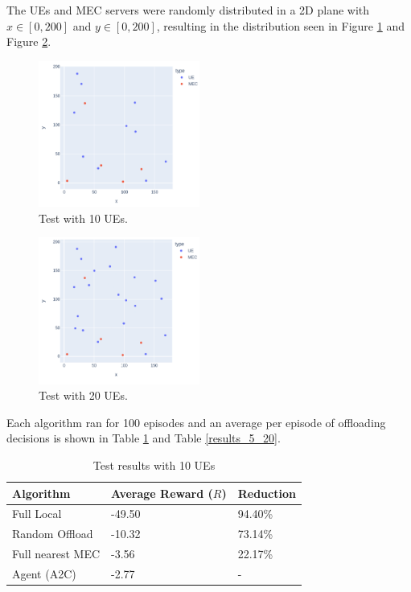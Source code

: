 \documentclass[conference]{IEEEtran}
\begin{document}
The UEs and MEC servers were randomly distributed in a 2D plane with $x \in [0, 200]$ and $y \in [0, 200]$, resulting in the distribution seen in Figure \ref{5_10_layout} and Figure \ref{5_20_layout}.

\begin{figure}[H]
  \centering
  \includegraphics[width=200px]{images/5_10_layout.png}
  \caption{Test with 10 \acrshort{UE}s.}  \label{5_10_layout}
\end{figure}
\begin{figure}[H]
  \centering
  \includegraphics[width=200px]{images/5_20_layout.png}
  \caption{Test with 20 \acrshort{UE}s.}  \label{5_20_layout}
\end{figure}

Each algorithm ran for 100 episodes and an average per episode of offloading decisions is shown in Table \ref{results_5_10} and Table \ref{results_5_20}.

\begin{table}[H]
\centering
\begin{tabular}{|l|l|l|}
\hline
Algorithm        & Average Reward ($R$) & Reduction\\ \hline
Full Local       & -49.50 & 94.40\%\\
Random Offload   & -10.32 & 73.14\%\\
Full nearest MEC & -3.56 & 22.17\%\\ 
Agent (A2C) & -2.77 & -\\ \hline
\end{tabular}
\caption{Test results with 10 \acrshort{UE}s} \label{results_5_10}
\end{table}
\end{document}
